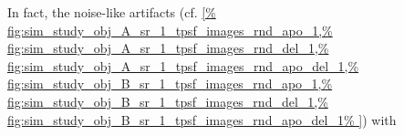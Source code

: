 In fact,
the noise-like artifacts
(cf. \cref{%
  fig:sim_study_obj_A_sr_1_tpsf_images_rnd_apo_1,%
  fig:sim_study_obj_A_sr_1_tpsf_images_rnd_del_1,%
  fig:sim_study_obj_A_sr_1_tpsf_images_rnd_apo_del_1,%
  fig:sim_study_obj_B_sr_1_tpsf_images_rnd_apo_1,%
  fig:sim_study_obj_B_sr_1_tpsf_images_rnd_del_1,%
  fig:sim_study_obj_B_sr_1_tpsf_images_rnd_apo_del_1%
}) with
